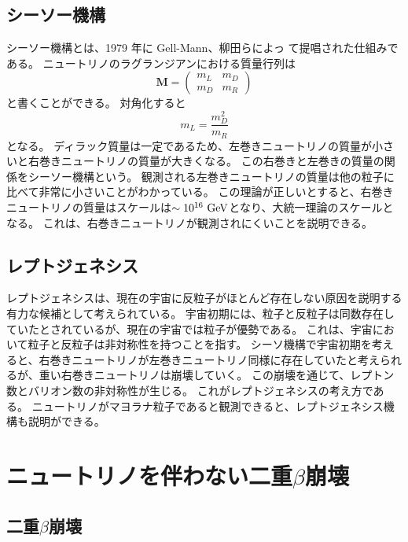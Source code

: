 \documentclass[a4paper,10pt]{jreport}
\begin{document}
\subsection{シーソー機構}

シーソー機構とは、1979 年に Gell-Mann、柳田らによっ て提唱された仕組みである。
ニュートリノのラグランジアンにおける質量行列は
\begin{equation} \label{Eq-MassMatrix}
	\bm{M} =
	\left(
		\begin{array}{cc}
		m_L & m_D \\
		m_D & m_R
		\end{array}
	\right)
\end{equation}
と書くことができる。
対角化すると
\begin{equation} \label{Eq-Seesaw}
	m_L=\frac{m_D^2}{m_R}
\end{equation}
となる。
ディラック質量は一定であるため、左巻きニュートリノの質量が小さいと右巻きニュートリノの質量が大きくなる。
この右巻きと左巻きの質量の関係をシーソー機構という。
観測される左巻きニュートリノの質量は他の粒子に比べて非常に小さいことがわかっている。
この理論が正しいとすると、右巻きニュートリノの質量はスケールは$\sim 10^{16}\  \rm{GeV}$となり、大統一理論のスケールとなる。
これは、右巻きニュートリノが観測されにくいことを説明できる。



\subsection{レプトジェネシス}

レプトジェネシスは、現在の宇宙に反粒子がほとんど存在しない原因を説明する有力な候補として考えられている。
宇宙初期には、粒子と反粒子は同数存在していたとされているが、現在の宇宙では粒子が優勢である。
これは、宇宙において粒子と反粒子は非対称性を持つことを指す。
シーソ機構で宇宙初期を考えると、右巻きニュートリノが左巻きニュートリノ同様に存在していたと考えられるが、重い右巻きニュートリノは崩壊していく。
この崩壊を通じて、レプトン数とバリオン数の非対称性が生じる。
これがレプトジェネシスの考え方である。
ニュートリノがマヨラナ粒子であると観測できると、レプトジェネシス機構も説明ができる。



\section{ニュートリノを伴わない二重$\beta$崩壊}



\subsection{二重$\beta$崩壊}
\end{document}
